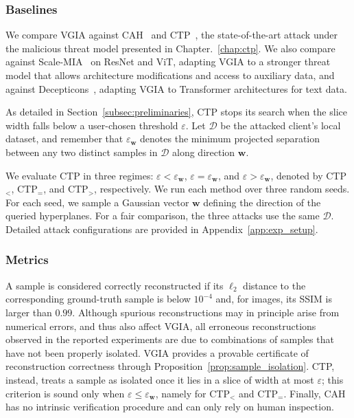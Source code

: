 \subsubsection{Baselines}
We compare VGIA against CAH~\cite{boenischWhenCuriousAbandon2023} and CTP~\cite{ctp_paper}, the state-of-the-art attack under the malicious threat model presented in Chapter.~\ref{chap:ctp}. 
We also compare against Scale-MIA~\cite{shiScaleMIAScalableModel2025} on ResNet and ViT,
adapting VGIA to a stronger threat model that allows architecture
modifications and access to auxiliary data, and against Decepticons~\cite{fowlDecepticonsCorruptedTransformers2022}, adapting VGIA to Transformer architectures for text data.

As detailed in Section~\ref{subsec:preliminaries}, CTP stops its search when the slice width falls below a user-chosen threshold $\varepsilon$. Let $\mathcal D$ be the attacked client's local dataset, and remember that $\varepsilon_{\mathbf w}$ denotes the minimum projected separation between any two distinct samples in $\mathcal D$ along direction $\mathbf w$.

We evaluate CTP in three regimes: $\varepsilon < \varepsilon_{\mathbf w}$, $\varepsilon = \varepsilon_{\mathbf w}$, and $\varepsilon > \varepsilon_{\mathbf w}$, denoted by CTP$_<$, CTP$_=$, and CTP$_>$, respectively.
We run each method over three random seeds. For each seed, we sample a Gaussian vector $\mathbf w$ defining the direction of the queried hyperplanes.
For a fair comparison, the three attacks use the same $\mathcal D$. Detailed attack configurations are provided in Appendix~\ref{app:exp_setup}.

\subsubsection{Metrics}
A sample is considered correctly reconstructed if its $\ell_2$ distance to the corresponding ground-truth sample is below $10^{-4}$ and, for images, its SSIM is larger than $0.99$. 
Although spurious reconstructions may in principle arise from numerical errors, and thus also affect VGIA, all erroneous reconstructions observed in the reported experiments are due to combinations of samples that have not been properly isolated.
VGIA provides a provable certificate of reconstruction correctness through Proposition~\ref{prop:sample_isolation}. CTP, instead, treats a sample as isolated once it lies in a slice of width at most $\varepsilon$; this criterion is sound only when $\varepsilon \leq \varepsilon_{\mathbf w}$, namely for CTP$_<$ and CTP$_=$. Finally, CAH has no intrinsic verification procedure and can only rely on human inspection.

